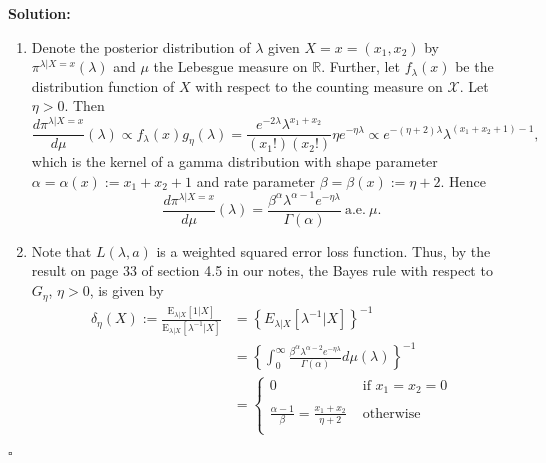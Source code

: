 \documentclass[12pt]{article}
\newcounter{ProofCounter}
\newenvironment{Solution}{\stepcounter{ProofCounter}\textbf{Solution:}}{\hfill$\square$}
\newcommand{\E}{\mathrm{E}}
\newcommand{\la}{\lambda}
\begin{document}
\begin{Solution}
\begin{enumerate}[label=(\alph*),leftmargin=*]
    \item Denote the posterior distribution of $\lambda$ given $X = x = (x_1, x_2)$ by $\pi^{\lambda|X = x}(\lambda)$ and $\mu$ the Lebesgue measure on
      $\mathbb{R}$. Further, let $f_{\la}(x)$ be the distribution function of $X$ with respect to the counting measure on $\mathcal{X}$. Let $\eta > 0$. Then 
      \[
        \frac{d \pi^{\lambda|X = x}}{d\mu}(\lambda) \propto f_{\la}(x) g_{\eta}(\la)  = \frac{e^{-2\la}\la^{x_1 + x_2}}{(x_1!)(x_2!)} \eta e^{-\eta
        \la} \propto e^{-(\eta + 2)\la}\la^{(x_1 + x_2 + 1) - 1},
      \]
      which is the kernel of a gamma distribution with shape parameter $\alpha = \alpha(x) := x_1 + x_2 + 1$ and rate parameter $\beta = \beta(x) :=
      \eta + 2$. Hence 
      \[
        \frac{d\pi^{\la|X=x}}{d\mu}(\la) = \frac{\beta^{\alpha}\la^{\alpha - 1}e^{-\eta \la}}{\Gamma(\alpha)} \ \text{a.e.} \ \mu.
      \]

    \item Note that $L(\la, a)$ is a weighted squared error loss function. Thus, by the result on page 33 of section 4.5 in our notes, the Bayes rule
      with respect to $G_{\eta}$, $\eta > 0$, is given by 
      \begin{align*}
        \delta_{\eta}(X) := \frac{\E_{\la|X}[1 | X]}{\E_{\la|X}[\la^{-1}|X]} & = \left\{ E_{\la|X}[\la^{-1}|X] \right\}^{-1} \\
        & = \left\{ \int_{0}^{\infty} \frac{\beta^{\alpha}\la^{\alpha - 2}e^{-\eta \la}}{\Gamma(\alpha)} d\mu(\la) \right\}^{-1} \\
        & = \left\{ \begin{array}{ll}
            0 & \text{ if } x_1 = x_2 = 0 \\ 
            \\
            \frac{\alpha - 1}{\beta} = \frac{x_1 + x_2}{\eta + 2} & \text{ otherwise } \\
        \end{array} \right.
      \end{align*}


\end{enumerate}
\end{Solution}
\end{document}

